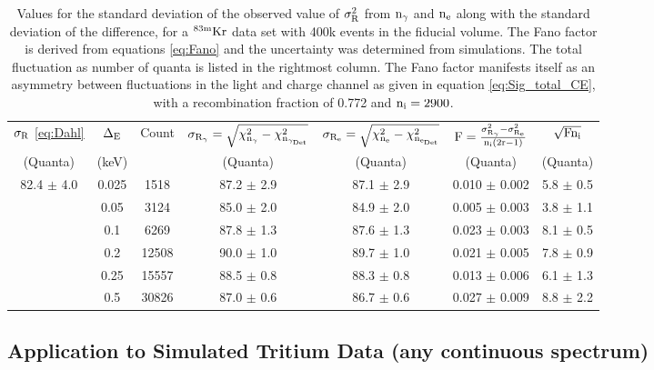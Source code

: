 \begin{table}[h!]
\begin{center}
\footnotesize
\tabcolsep=0.11cm
\begin{tabular}{|c||c|c|c|c|c|c|}
\hline
$\rm \sigma_R$ \ref{eq:Dahl} & $\rm \Delta_E$ & Count & $\rm \sigma_{R_\gamma}=\sqrt{\chi_{n_{\gamma}}^2-\chi_{n_{\gamma_{Det}}}^2}$ & $\rm \sigma_{R_e}= \sqrt{\chi_{n_{e}}^2-\chi_{n_{e_{Det}}}^2}$  & $\rm F=\frac{\sigma_{R_{\gamma}}^2-\sigma_{R_e}^2}{n_i(2r-1) }$ &$\rm \sqrt{Fn_i}$ \\ 
(Quanta) & (keV) & & (Quanta) & (Quanta) & (Quanta) & (Quanta)\\ \hline
82.4 $\pm$ 4.0		& 0.025		& 1518 		& 87.2 $\pm$ 2.9	 	&	87.1 $\pm$ 2.9	& 0.010 $\pm$ 0.002     & 5.8 $\pm$ 0.5 \\ \hline
					& 0.05 		& 3124 		& 85.0 $\pm$ 2.0	 	&	84.9 $\pm$ 2.0	& 0.005 $\pm$ 0.003	& 3.8 $\pm$ 1.1 \\ \hline
					& 0.1 		& 6269  	& 87.8 $\pm$ 1.3		& 	87.6 $\pm$ 1.3	& 0.023 $\pm$ 0.003	& 8.1 $\pm$ 0.5	 \\ \hline
					& 0.2 		&12508  	& 90.0 $\pm$ 1.0  		& 	89.7 $\pm$ 1.0	& 0.021 $\pm$ 0.005	& 7.8 $\pm$ 0.9	 \\ \hline
					& 0.25 		&15557 	& 88.5 $\pm$ 0.8		&	88.3 $\pm$ 0.8  & 0.013 $\pm$ 0.006	& 6.1 $\pm$ 1.3	 \\ \hline
					& 0.5		& 30826 	& 87.0  $\pm$ 0.6		&	86.7 $\pm$ 0.6	& 0.027	$\pm$  0.009 	& 8.8 $\pm$ 2.2	\\ \hline
\end{tabular}
\caption{Values for the standard deviation of the observed value of $\rm \sigma_R^2$ from $\rm n_\gamma$ and $\rm n_e$ along with the standard deviation of the difference, for a $\rm^{83m}Kr$ data set with 400k events in the fiducial volume. The Fano factor is derived from equations \ref{eq:Fano} and the uncertainty was determined from simulations. The total fluctuation as number of quanta is listed in the rightmost column. The Fano factor manifests itself as an asymmetry between fluctuations in the light and charge channel as given in equation \ref{eq:Sig_total_CE}, with a recombination fraction of 0.772 and $\rm n_i = 2900$. }%
\label{table:R_Kr}
\end{center}
\end{table}


\subsection{Application to Simulated Tritium Data (any continuous spectrum)}

